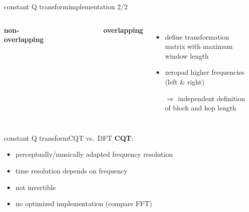         \begin{frame}{constant Q transform}{implementation 2/2}
            \vspace{-5mm}
            \begin{columns}
                    \begin{center}\textbf{non-overlapping}\end{center}
                    \vspace{-8mm}
                    \begin{figure}
                    \centering
                        \scalebox{1.2}{}
                    \end{figure}
                    \begin{center}\textbf{overlapping}\end{center}
                    \vspace{10mm}
                    \begin{itemize}
                        \item   define transformation matrix with maximum window length
                        \item   zeropad higher frequencies (left \& right)
                        \bigskip
                        \item[$\Rightarrow$] independent definition of block and hop length
                    \end{itemize}
                    \vspace{15mm}
                \end{columns}
        \end{frame}	

        \begin{frame}{constant Q transform}{CQT vs.\ DFT}
            \textbf{CQT}:
            \bigskip
            \begin{itemize}
                \item<1->[+]	perceptually/musically adapted frequency resolution
                \smallskip
                \item<2->[--]	time resolution depends on frequency
                \smallskip
                \item<3->[--]	not invertible
                \smallskip
                \item<4->[--]	no optimized implementation (compare FFT)
            \end{itemize}
        \end{frame}	

